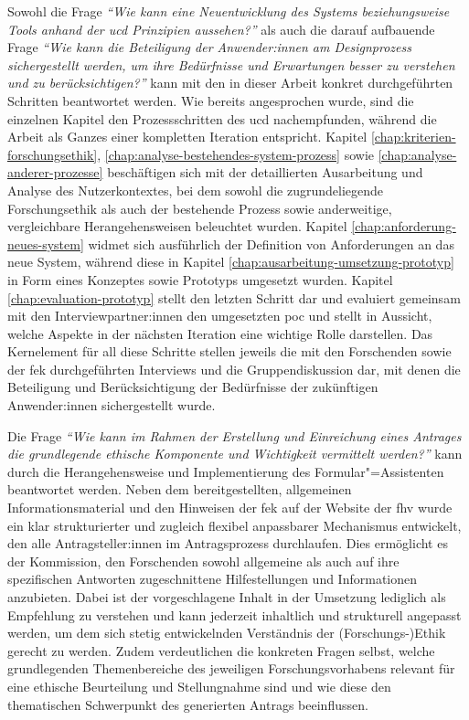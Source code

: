 \documentclass[a4paper,12pt,twoside]{scrreprt}
\begin{document}
Sowohl die Frage \textit{\enquote{Wie kann eine Neuentwicklung des Systems beziehungsweise Tools anhand der \acl{ucd} Prinzipien aussehen?}} als auch die darauf aufbauende Frage \textit{\enquote{Wie kann die Beteiligung der Anwender:innen am Designprozess sichergestellt werden, um ihre Bedürfnisse und Erwartungen besser zu verstehen und zu berücksichtigen?}} kann mit den in dieser Arbeit konkret durchgeführten Schritten beantwortet werden. Wie bereits angesprochen wurde, sind die einzelnen Kapitel den Prozessschritten des \ac{ucd} nachempfunden, während die Arbeit als Ganzes einer kompletten Iteration entspricht. Kapitel \ref{chap:kriterien-forschungsethik}, \ref{chap:analyse-bestehendes-system-prozess} sowie \ref{chap:analyse-anderer-prozesse} beschäftigen sich mit der detaillierten Ausarbeitung und Analyse des Nutzerkontextes, bei dem sowohl die zugrundeliegende Forschungsethik als auch der bestehende Prozess sowie anderweitige, vergleichbare Herangehensweisen beleuchtet wurden. Kapitel \ref{chap:anforderung-neues-system} widmet sich ausführlich der Definition von Anforderungen an das neue System, während diese in Kapitel \ref{chap:ausarbeitung-umsetzung-prototyp} in Form eines Konzeptes sowie Prototyps umgesetzt wurden. Kapitel \ref{chap:evaluation-prototyp} stellt den letzten Schritt dar und evaluiert gemeinsam mit den Interviewpartner:innen den umgesetzten \ac{poc} und stellt in Aussicht, welche Aspekte in der nächsten Iteration eine wichtige Rolle darstellen. Das Kernelement für all diese Schritte stellen jeweils die mit den Forschenden sowie der \ac{fek} durchgeführten Interviews und die Gruppendiskussion dar, mit denen die Beteiligung und Berücksichtigung der Bedürfnisse der zukünftigen Anwender:innen sichergestellt wurde.

\medskip

Die Frage \textit{\enquote{Wie kann im Rahmen der Erstellung und Einreichung eines Antrages die grundlegende ethische Komponente und Wichtigkeit vermittelt werden?}} kann durch die Herangehensweise und Implementierung des Formular"=Assistenten beantwortet werden. Neben dem bereitgestellten, allgemeinen Informationsmaterial und den Hinweisen der \acl{fek} auf der Website der \ac{fhv} wurde ein klar strukturierter und zugleich flexibel anpassbarer Mechanismus entwickelt, den alle Antragsteller:innen im Antragsprozess durchlaufen. Dies ermöglicht es der Kommission, den Forschenden sowohl allgemeine als auch auf ihre spezifischen Antworten zugeschnittene Hilfestellungen und Informationen anzubieten. Dabei ist der vorgeschlagene Inhalt in der Umsetzung lediglich als Empfehlung zu verstehen und kann jederzeit inhaltlich und strukturell angepasst werden, um dem sich stetig entwickelnden Verständnis der (Forschungs-)Ethik gerecht zu werden. Zudem verdeutlichen die konkreten Fragen selbst, welche grundlegenden Themenbereiche des jeweiligen Forschungsvorhabens relevant für eine ethische Beurteilung und Stellungnahme sind und wie diese den thematischen Schwerpunkt des generierten Antrags beeinflussen.
\end{document}
